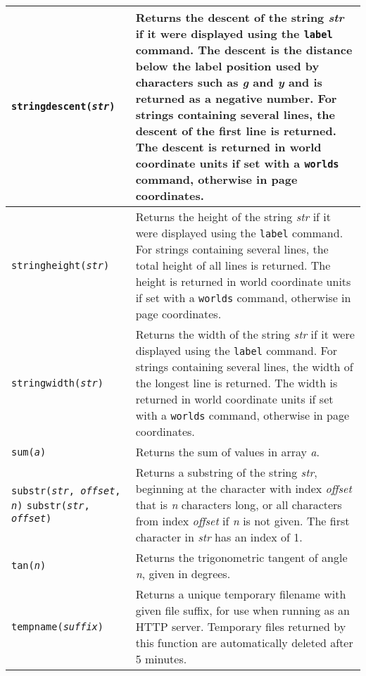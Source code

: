 \begin{longtable}{|p{5cm}|p{7cm}|}
\hline

\texttt{stringdescent(\textit{str})} &
Returns the descent of the string \textit{str}
if it were displayed using the \texttt{label} command.
The descent is the distance below the label position
used by characters such as \textit{g} and \textit{y}
and is returned as a negative number.
For strings containing several lines, the descent of the
first line is returned.
The descent is returned in world coordinate units if set with a
\texttt{worlds} command, otherwise in page coordinates. \\

\hline

\texttt{stringheight(\textit{str})} &
Returns the height of the string \textit{str}
if it were displayed using the \texttt{label} command.
For strings containing several lines, the total height of all
lines is returned.
The height is returned in world coordinate units if set with a
\texttt{worlds} command, otherwise in page coordinates. \\

\hline

\texttt{stringwidth(\textit{str})} &
Returns the width of the string \textit{str}
if it were displayed using the \texttt{label} command.
For strings containing several lines, the width of the longest
line is returned.
The width is returned in world coordinate units if set with a
\texttt{worlds} command, otherwise in page coordinates. \\

\hline

\texttt{sum(\textit{a})} &
Returns the sum of values in array \textit{a}. \\

\hline

\texttt{substr(\textit{str}, \textit{offset}, \textit{n})}
\texttt{substr(\textit{str}, \textit{offset})} &
Returns a substring of the string \textit{str}, beginning at the
character with index \textit{offset} that is \textit{n} characters long,
or all characters from index \textit{offset} if
\textit{n} is not given.
The first character in \textit{str} has an index of 1. \\

\hline

\texttt{tan(\textit{n})} &
Returns the trigonometric tangent of angle \textit{n}, given in degrees. \\

\hline

\texttt{tempname(\textit{suffix})} &
Returns a unique temporary filename with given file suffix,
for use when running as an HTTP server.
Temporary files returned by this function
are automatically deleted after 5 minutes. \\


\end{longtable}
